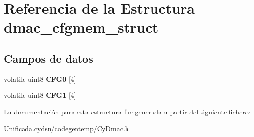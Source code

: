 \hypertarget{structdmac__cfgmem__struct}{}\section{Referencia de la Estructura dmac\+\_\+cfgmem\+\_\+struct}
\label{structdmac__cfgmem__struct}
\subsection*{Campos de datos}
\begin{DoxyCompactItemize}
\item 
\mbox{\label{structdmac__cfgmem__struct_a8d1f64d42f01c6494b9751d2d4d07f05}} 
volatile uint8 {\bfseries C\+F\+G0} \mbox{[}4\mbox{]}
\item 
\mbox{\label{structdmac__cfgmem__struct_a2d36c22b819c141991e2f5fb49fec947}} 
volatile uint8 {\bfseries C\+F\+G1} \mbox{[}4\mbox{]}
\end{DoxyCompactItemize}


La documentación para esta estructura fue generada a partir del siguiente fichero\+:\begin{DoxyCompactItemize}
\item 
Unificada.\+cydsn/codegentemp/Cy\+Dmac.\+h\end{DoxyCompactItemize}
